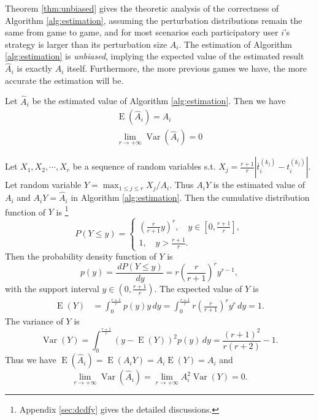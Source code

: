 \documentclass{IEEEtran}
\begin{document}
Theorem \ref{thm:unbiased} gives the theoretic analysis of the correctness of Algorithm \ref{alg:estimation}, assuming the perturbation distributions remain the same from game to game, and for most scenarios each participatory user $i$'s strategy is larger than its perturbation size $A_i$. The estimation of Algorithm \ref{alg:estimation} is \emph{unbiased}, implying the expected value of the estimated result $\hat{A}_i$ is exactly $A_i$ itself. Furthermore, the more previous games we have, the more accurate the estimation will be.
\begin{theorem}
\label{thm:unbiased}
Let $\hat{A}_i$ be the estimated value of Algorithm \ref{alg:estimation}. Then we have
\begin{eqnarray}
\operatorname{E}(\hat{A}_i)=A_i\\
\lim_{r\rightarrow +\infty}\operatorname{Var}(\hat{A}_i)=0
\end{eqnarray}
\end{theorem}

\begin{IEEEproof}
Let $X_1,X_2,\cdots,X_r$ be a sequence of random variables s.t. $X_j=\frac{r+1}{r}|\overline{t}_i^{(k_j)}-t_i^{(k_j)}|$. Let random variable $Y=\max_{1\leq j\leq r}X_j/A_i$. Thus $A_iY$ is the estimated value of $A_i$ and $A_iY=\hat{A}_i$ in Algorithm \ref{alg:estimation}. Then the cumulative distribution function of $Y$ is \footnote{Appendix \ref{sec:dcdfy} gives the detailed discussions.}
\begin{equation}
\label{eqn:cdfy}
P(Y\leq y)=\begin{cases}(\frac{r}{r+1}y)^r, \quad y\in [0, \frac{r+1}{r}],\\
1, \quad y>\frac{r+1}{r}.
\end{cases}
\end{equation}
Then the probability density function of $Y$ is
\begin{equation}
p(y)=\frac{\,dP(Y\leq y)}{\,dy}=r(\frac{r}{r+1})^ry^{r-1},
\end{equation}
with the support interval $y\in (0, \frac{r+1}{r})$. The expected value of $Y$ is
\begin{equation}
\begin{aligned}
\operatorname{E}(Y) &=\int_0^{\frac{r+1}{r}}p(y)y \,dy = \int_0^{\frac{r+1}{r}}r(\frac{r}{r+1})^ry^r \,dy = 1.
\end{aligned}
\end{equation}
The variance of $Y$ is
\begin{equation}
\operatorname{Var}(Y) = \int_0^{\frac{r+1}{r}}(y-\operatorname{E}(Y))^2p(y) \,dy = \frac{(r+1)^2}{r(r+2)}-1.%
\end{equation}
Thus we have $\operatorname{E}(\hat{A}_i)=\operatorname{E}(A_iY)=A_i\operatorname{E}(Y)=A_i$ and
\begin{equation}
\lim_{r\rightarrow +\infty}\operatorname{Var}(\hat{A}_i)=\lim_{r\rightarrow +\infty}A_i^2\operatorname{Var}(Y) = 0.
\end{equation}
\end{IEEEproof}
\end{document}
